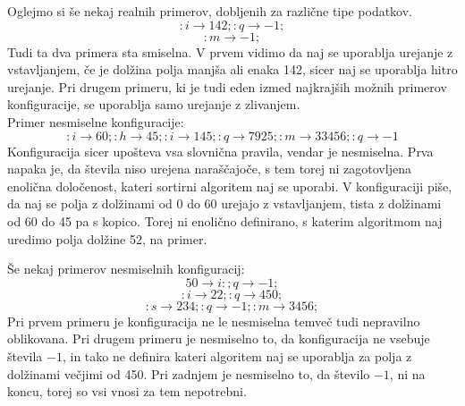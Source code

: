 \documentclass[a4paper,oneside,12pt]{article}
\newcommand{\ntm}[1]{\ensuremath{<\!\!\text{#1}\!\!>}}
\newcommand{\lra}{\ensuremath{\longrightarrow}}
\begin{document}
Oglejmo si še nekaj realnih primerov, dobljenih za različne tipe podatkov.
\[ :i \lra 142;:q \lra -1;\]
\[ :m \lra -1; \]
Tudi ta dva primera sta smiselna. V prvem vidimo da naj se uporablja urejanje z
vstavljanjem, če je dolžina polja manjša ali enaka 142, sicer naj se uporablja hitro
urejanje. Pri drugem primeru, ki je tudi eden izmed najkrajših možnih primerov
konfiguracije, se uporablja samo urejanje z zlivanjem.\\

Primer nesmiselne konfiguracije:
\[ :i \lra 60;:h \lra 45;:i \lra 145;:q \lra 7925;:m \lra 33456;:q \lra -1 \]
Konfiguracija sicer upošteva vsa slovnična pravila, vendar je nesmiselna. Prva napaka je,
da števila niso urejena naraščajoče, s tem torej ni zagotovljena enolična določenost,
kateri sortirni algoritem naj se uporabi. V konfiguraciji piše, da naj se polja z
dolžinami od 0 do 60 urejajo z vstavljanjem, tista z dolžinami od 60 do 45 pa s kopico.
Torej ni enolično definirano, s katerim algoritmom naj uredimo polja dolžine 52, na primer. 

Še nekaj primerov nesmiselnih konfiguracij:
\[ 50 \lra i:;q \lra -1; \]
\[ :i \lra 22;:q \lra 450; \]
\[ :s \lra 234;:q \lra -1;: m \lra 3456; \]
Pri prvem primeru je konfiguracija ne le nesmiselna temveč tudi nepravilno oblikovana.
Pri drugem primeru je nesmiselno to, da konfiguracija ne vsebuje števila $-1$, in tako ne
definira kateri algoritem naj se uporablja za polja z dolžinami večjimi od 450.
Pri zadnjem je nesmiselno to, da število $-1$, ni na koncu, torej so
vsi vnosi za tem nepotrebni.

\end{document}
